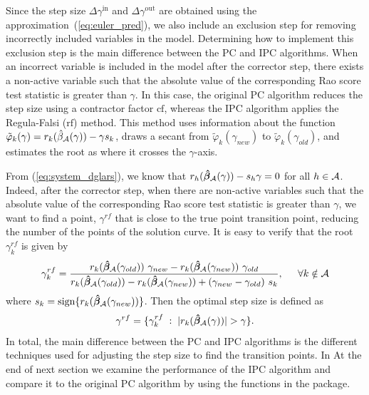 Since the step size $\Delta\gamma^{\text{in}}$ and $\Delta\gamma^{\text{out}}$ are obtained using the approximation~(\ref{eq:euler_pred}), we also include an exclusion step for removing incorrectly included variables in the model. Determining how to implement this exclusion step is the main difference between the PC and IPC algorithms. When an incorrect variable is included in the model after the corrector step, there exists a non-active variable such that the absolute value of the corresponding Rao score test statistic is greater than $\gamma$. In this case, the original PC algorithm reduces the step size using a contractor factor $\mbox{cf}$, whereas the IPC algorithm applies the Regula-Falsi ($\mbox{rf}$) method. This method uses information about the function $\tilde\varphi_k(\gamma) = r_k(\hat\beta_{\mathcal{A}}(\gamma)) - \gamma s_k$,  draws a secant from $\tilde\varphi_k(\gamma_{new})$ to $\tilde\varphi_k(\gamma_{old})$, and estimates the root as where it crosses the $\gamma$-axis. 

From (\ref{eq:system_dglars}), we know that  $r_{h} (\bm{\hat\beta}_{\mathcal{A}}(\gamma))-s_h \gamma = 0$ for all $h\in\mathcal{A}$. Indeed, after the corrector step, when there are non-active variables such that the absolute value of the corresponding Rao score test statistic is greater than $ \gamma$, we want to find a point, $\gamma^{rf}$ that is close to the true point transition point, reducing the number of the points of the solution curve.
It is easy to verify that the root $\gamma^{rf}_k$ is given by
%
\begin{align}
\gamma^{rf}_k = \frac{r_{k} (\bm{\hat\beta}_\mA(\gamma_{old})) \ \gamma_{new} -  r_{k} (\bm{\hat\beta}_\mA(\gamma_{new})) \ \gamma_{old} }{ r_k (\bm{\hat\beta}_\mA(\gamma_{old}))- r_k (\bm{\hat\beta}_\mA(\gamma_{new}))+  (\gamma_{new}-\gamma_{old}) \ s_k}, 
\hspace{0.2in} \forall k \notin \mA
\label{eq:mystepsize5}
\end{align}
%
where  $ s_k= \text{sign}\{r_k(\bm{\hat\beta}_{\mathcal{A}}(\gamma_{new}))\}$. Then the optimal step size is defined as
%
$$
\gamma^{rf} = \{\gamma^{rf}_k\;:\; |r_k (\bm{\hat\beta}_{\mathcal{A}}(\gamma))| > \gamma\}.
$$
In total, the main difference between the PC and IPC algorithms is the different techniques used for adjusting the step size to find the transition points. In At the end of next section we examine the performance of the IPC algorithm and compare it to the original PC algorithm by using the functions in the  package.




